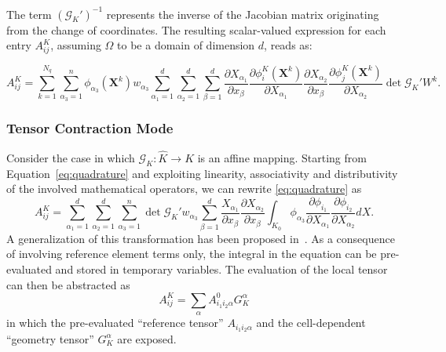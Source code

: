 The term $(\mathcal{G}_K')^{-1}$ represents the inverse of the Jacobian matrix originating from the change of coordinates. The resulting scalar-valued expression for each entry $A_{ij}^K$, assuming $\Omega$ to be a domain of dimension $d$, reads as:

\begin{equation}
\label{eq:quadrature}
A_{ij}^K = \sum_{k=1}^{N_q} \sum_{\alpha_3=1}^n \phi_{\alpha_3}(\boldsymbol{X}^k) w_{\alpha_3} \sum_{\alpha_1=1}^d \sum_{\alpha_2=1}^d \sum_{\beta=1}^d \frac{\partial X_{\alpha_1}}{\partial x_{\beta}} \frac{\partial \phi_i^K(\boldsymbol{X}^k)}{\partial X_{\alpha_1}} \frac{\partial X_{\alpha_2}}{\partial x_{\beta}} \frac{\partial \phi_j^K(\boldsymbol{X}^k)}{\partial X_{\alpha_2}} \operatorname{det} \mathcal{G}_K' W^k.
\end{equation}


\subsubsection{Tensor Contraction Mode}
Consider the case in which $\mathcal{G}_K : \hat{K} \rightarrow K$ is an affine mapping. Starting from Equation~\ref{eq:quadrature} and exploiting linearity, associativity and distributivity of the involved mathematical operators, we can rewrite \ref{eq:quadrature} as
\begin{equation}
\label{eq:tensor}
A_{ij}^K = \sum_{\alpha_1=1}^d \sum_{\alpha_2=1}^d \sum_{\alpha_3=1}^n \operatorname{det} \mathcal{G}_K' w_{\alpha_3} \sum_{\beta=1}^d \frac{X_{\alpha_1}}{\partial x_{\beta}} \frac{\partial X_{\alpha_2}}{\partial x_{\beta}} \int_{K_0} \phi_{\alpha_3} \frac{\partial \phi_{i_1}}{\partial X_{\alpha_1}} \frac{\partial \phi_{i_2}}{\partial X_{\alpha_2}} dX.
\end{equation}
A generalization of this transformation has been proposed in~\cite{FFC-TC}. As a consequence of involving reference element terms only, the integral in the equation can be pre-evaluated and stored in temporary variables. The evaluation of the local tensor can then be abstracted as
\begin{equation}
A_{ij}^K = \sum_{\alpha} A_{i_1 i_2 \alpha}^0 G_{K}^\alpha
\end{equation}
in which the pre-evaluated ``reference tensor'' $A_{i_1 i_2 \alpha}$ and the cell-dependent ``geometry tensor'' $G_{K}^\alpha$ are exposed. 


